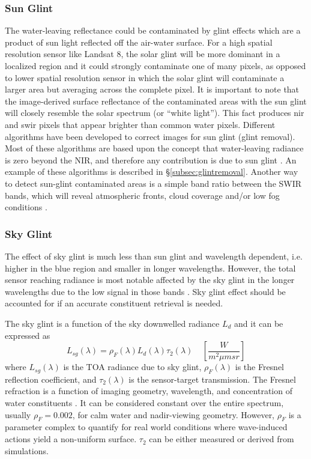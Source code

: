 \subsubsection*{Sun Glint}
The water-leaving reflectance could be contaminated by glint effects which are a product of sun light reflected off the air-water surface. For a high spatial resolution sensor like Landsat 8, the solar glint will be more dominant in a localized region and it could strongly contaminate one of many pixels, as opposed to lower spatial resolution sensor in which the solar glint will contaminate a larger area but averaging across the complete pixel. It is important to note that the image-derived surface reflectance of the contaminated areas with the sun glint will closely resemble the solar spectrum (or ``white light''). This fact produces \gls{nir} and \gls{swir} pixels that appear brighter than common water pixels. Different algorithms have been developed to correct images for sun glint (glint removal). Most of these algorithms are based upon the concept that water-leaving radiance is zero beyond the NIR, and therefore any contribution is due to sun glint \citep{Pahlevan:2012}. An example of these algorithms is described in \S\ref{subsec:glintremoval}. Another way to detect sun-glint contaminated areas is a simple band ratio between the SWIR bands, which will reveal atmospheric fronts, cloud coverage and/or low fog conditions \citep{Pahlevan:2012}.
\subsubsection*{Sky Glint}
The effect of sky glint is much less than sun glint and wavelength dependent, i.e. higher in the blue region and smaller in longer wavelengths. However, the total sensor reaching radiance is most notable affected by the sky glint in the longer wavelengths due to the low signal in those bands \citep{Pahlevan:2012}. Sky glint effect should be accounted for if an accurate constituent retrieval is needed.

The sky glint is a function of the sky downwelled radiance $L_d$ and it can be expressed as
\begin{equation}
  L_{sg}(\lambda) = \rho_F(\lambda)L_d(\lambda)\tau_2(\lambda)~~~~~\left[\frac{W}{m^2\mu msr}\right]
\end{equation}
where $L_{sg}(\lambda)$ is the TOA radiance due to sky glint, $\rho_F(\lambda)$ is the Fresnel reflection coefficient, and $\tau_2(\lambda)$ is the sensor-target transmission. The Fresnel refraction is a function of imaging geometry, wavelength, and concentration of water constituents \citep{Pahlevan:2012}. It can be considered constant over the entire spectrum, usually $\rho_F=0.002$, for calm water and nadir-viewing geometry. However, $\rho_F$ is a parameter complex to quantify for real world conditions where wave-induced actions yield a non-uniform surface. $\tau_2$ can be either measured or derived from simulations.



